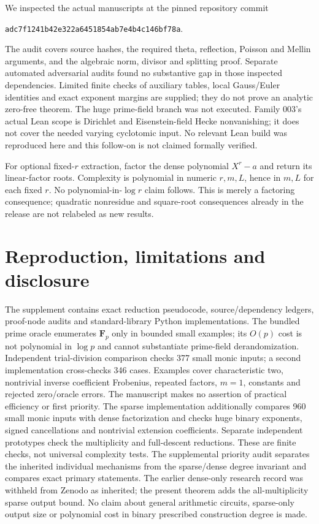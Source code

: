 \documentclass[11pt]{article}
\newcommand{\Fp}{\mathbf F_p}
\begin{document}
We inspected the actual manuscripts at the pinned repository commit
\begin{center}\small\texttt{adc7f1241b42e322a6451854ab7e4b4c146bf78a}.\end{center}
The audit covers source hashes, the required theta, reflection, Poisson and
Mellin arguments, and the algebraic norm, divisor and splitting proof. Separate automated adversarial audits found
no substantive gap in those inspected dependencies. Limited finite checks
of auxiliary tables, local Gauss/Euler identities and exact exponent
margins are supplied; they do not prove an analytic zero-free theorem.
The huge prime-field branch was not executed. Family 003's actual Lean
scope is Dirichlet and Eisenstein-field Hecke nonvanishing; it does not
cover the needed varying cyclotomic input. No relevant Lean build was
reproduced here and this follow-on is not claimed formally verified.

For optional fixed-$r$ extraction, factor the dense polynomial $X^r-a$
and return its linear-factor roots. Complexity is polynomial in numeric
$r,m,L$, hence in $m,L$ for each fixed $r$. No polynomial-in-$\log r$
claim follows. This is merely a factoring consequence; quadratic
nonresidue and square-root consequences already in the release are not
relabeled as new results.

\section{Reproduction, limitations and disclosure}
The supplement contains exact reduction pseudocode, source/dependency
ledgers, proof-node audits and standard-library Python implementations.
The bundled prime oracle enumerates $\Fp$ only in bounded small examples;
its $O(p)$ cost is not polynomial in $\log p$ and cannot substantiate
prime-field derandomization. Independent trial-division comparison checks
377 small monic inputs; a second implementation cross-checks 346 cases.
Examples cover characteristic two, nontrivial inverse coefficient Frobenius,
repeated factors, $m=1$, constants and rejected zero/oracle errors.
The manuscript makes no assertion of practical efficiency or first priority.
The sparse implementation additionally compares 960 small monic inputs with
dense factorization and checks huge binary exponents, signed cancellations
and nontrivial extension coefficients. Separate independent prototypes
check the multiplicity and full-descent reductions. These are finite checks,
not universal complexity tests. The supplemental priority audit separates
the inherited individual mechanisms from the sparse/dense degree invariant
and compares exact primary statements. The earlier dense-only research
record was withheld from Zenodo as inherited; the present theorem adds the
all-multiplicity sparse output bound. No claim about general arithmetic
circuits, sparse-only output size or polynomial cost in binary prescribed
construction degree is made.
\end{document}
